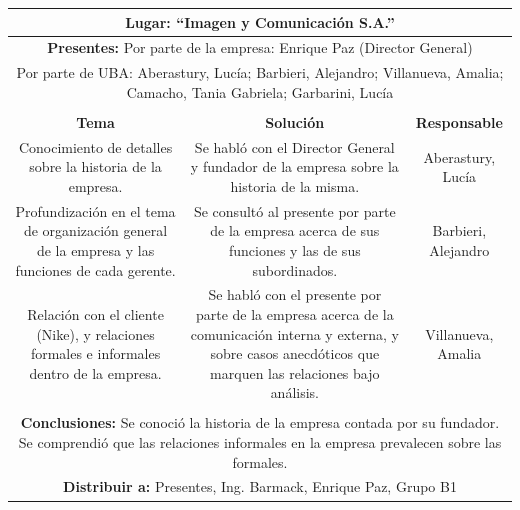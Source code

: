 \documentclass[a4paper,10pt,titlepage]{article}
\begin{document}
\begin{itemize}
\begin{center}
\begin{tabular}{|c|c|c|}
	\multicolumn{3}{|c|}{\textbf{Lugar:} ``Imagen y Comunicaci\'on S.A.''} \\
	\hline \multicolumn{3}{|p{0.86\linewidth}|}{\textbf{Presentes:} Por parte de la empresa: Enrique Paz (Director General)} \\
	\multicolumn{3}{|p{0.86\linewidth}|}{Por parte de UBA: Aberastury, Luc\'ia; Barbieri, Alejandro; Villanueva, Amalia; Camacho, Tania Gabriela; Garbarini, Luc\'ia} \\
	\hline
    \rowcolor[gray]{0.8} & & \\
    \hline
    \textbf{Tema} & \textbf{Solución} & \textbf{Responsable}\\
    \hline
    \multicolumn{1}{|p{0.33\linewidth}|}{Conocimiento de detalles sobre la historia de la empresa.} & \multicolumn{1}{p{0.33\linewidth}|}{Se habló con el Director General y fundador de la empresa sobre la historia de la misma.} & \multicolumn{1}{p{0.20\linewidth}|}{Aberastury, Luc\'ia}\\\hline
    \multicolumn{1}{|p{0.33\linewidth}|}{Profundizaci\'on en el tema de organizaci\'on general de la empresa y las funciones de cada gerente.} & \multicolumn{1}{p{0.33\linewidth}|}{Se consult\'o al presente por parte de la empresa acerca de sus funciones y las de sus subordinados.} & \multicolumn{1}{p{0.20\linewidth}|}{Barbieri, Alejandro}\\\hline
    \multicolumn{1}{|p{0.33\linewidth}|}{Relaci\'on con el cliente (Nike), y relaciones formales e informales dentro de la empresa.} & \multicolumn{1}{p{0.33\linewidth}|}{Se habl\'o con el presente por parte de la empresa acerca de la comunicaci\'on interna y externa, y sobre casos anecd\'oticos que marquen las relaciones bajo an\'alisis.} & \multicolumn{1}{p{0.20\linewidth}|}{Villanueva, Amalia}\\\hline
    \rowcolor[gray]{0.8} & & \\\hline
    \multicolumn{3}{|p{0.86\linewidth}|}{\textbf{Conclusiones:} Se conoci\'o la historia de la empresa contada por su fundador. Se comprendi\'o que las relaciones informales en la empresa prevalecen sobre las formales.}\\\hline
    \multicolumn{3}{|p{0.86\linewidth}|}{\textbf{Distribuir a:} Presentes, Ing. Barmack, Enrique Paz, Grupo B1}\\\hline
\end{tabular} 
\end{center}



\end{itemize}
\end{document}
